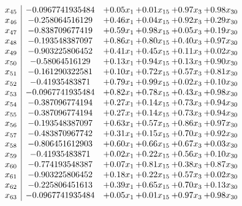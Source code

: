 \documentclass[8pt]{article}
\begin{document}
\[\begin{array}{c| c c@{\hskip 2pt} c@{\hskip 2pt} c@{\hskip 2pt} c@{\hskip 2pt} }
 x_{45}   &  -0.0967741935484 & +  0.05 x_{1} & +  0.01 x_{15} & +  0.97 x_{3} & +  0.98 x_{30}\\
 x_{46}   &  -0.258064516129 & +  0.46 x_{1} & +  0.04 x_{15} & +  0.92 x_{3} & +  0.29 x_{30}\\
 x_{47}   &  -0.838709677419 & +  0.59 x_{1} & +  0.98 x_{15} & +  0.05 x_{3} & +  0.19 x_{30}\\
 x_{48}   &  -0.193548387097 & +  0.86 x_{1} & +  0.80 x_{15} & +  0.40 x_{3} & +  0.97 x_{30}\\
 x_{49}   &  -0.903225806452 & +  0.41 x_{1} & +  0.45 x_{15} & +  0.11 x_{3} & +  0.02 x_{30}\\
 x_{50}   &  -0.58064516129 & +  0.13 x_{1} & +  0.94 x_{15} & +  0.13 x_{3} & +  0.90 x_{30}\\
 x_{51}   &  -0.161290322581 & +  0.10 x_{1} & +  0.72 x_{15} & +  0.57 x_{3} & +  0.81 x_{30}\\
 x_{52}   &  -0.41935483871 & +  0.79 x_{1} & +  0.99 x_{15} & +  0.02 x_{3} & +  0.10 x_{30}\\
 x_{53}   &  -0.0967741935484 & +  0.82 x_{1} & +  0.78 x_{15} & +  0.43 x_{3} & +  0.98 x_{30}\\
 x_{54}   &  -0.387096774194 & +  0.27 x_{1} & +  0.14 x_{15} & +  0.73 x_{3} & +  0.94 x_{30}\\
 x_{55}   &  -0.387096774194 & +  0.27 x_{1} & +  0.14 x_{15} & +  0.73 x_{3} & +  0.94 x_{30}\\
 x_{56}   &  -0.193548387097 & +  0.63 x_{1} & +  0.57 x_{15} & +  0.86 x_{3} & +  0.97 x_{30}\\
 x_{57}   &  -0.483870967742 & +  0.31 x_{1} & +  0.15 x_{15} & +  0.70 x_{3} & +  0.92 x_{30}\\
 x_{58}   &  -0.806451612903 & +  0.60 x_{1} & +  0.66 x_{15} & +  0.67 x_{3} & +  0.03 x_{30}\\
 x_{59}   &  -0.41935483871 & +  0.02 x_{1} & +  0.22 x_{15} & +  0.56 x_{3} & +  0.10 x_{30}\\
 x_{60}   &  -0.774193548387 & +  0.07 x_{1} & +  0.81 x_{15} & +  0.38 x_{3} & +  0.87 x_{30}\\
 x_{61}   &  -0.903225806452 & +  0.18 x_{1} & +  0.22 x_{15} & +  0.57 x_{3} & +  0.02 x_{30}\\
 x_{62}   &  -0.225806451613 & +  0.39 x_{1} & +  0.65 x_{15} & +  0.70 x_{3} & +  0.13 x_{30}\\
 x_{63}   &  -0.0967741935484 & +  0.05 x_{1} & +  0.01 x_{15} & +  0.97 x_{3} & +  0.98 x_{30}\\

\end{array}\]
\end{document}
